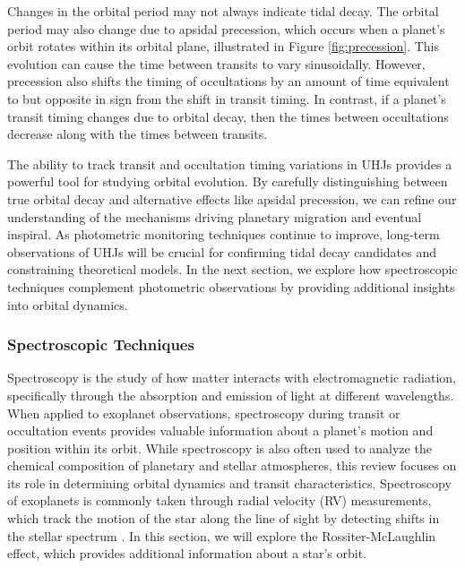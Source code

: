 \documentclass[oneside,12pt]{amsart}
\numberwithin{page}{section}
\begin{document}
Changes in the orbital period may not always indicate tidal decay. The orbital period may also change due to apsidal precession, which occurs when a planet's orbit rotates within its orbital plane, illustrated in Figure \ref{fig:precession}. This evolution can cause the time between transits to vary sinusoidally. However, precession also shifts the timing of occultations by an amount of time equivalent to but opposite in sign from the shift in transit timing. In contrast, if a planet's transit timing changes due to orbital decay, then the times between occultations decrease along with the times between transits.

The ability to track transit and occultation timing variations in UHJs provides a powerful tool for studying orbital evolution. By carefully distinguishing between true orbital decay and alternative effects like apsidal precession, we can refine our understanding of the mechanisms driving planetary migration and eventual inspiral. As photometric monitoring techniques continue to improve, long-term observations of UHJs will be crucial for confirming tidal decay candidates and constraining theoretical models. In the next section, we explore how spectroscopic techniques complement photometric observations by providing additional insights into orbital dynamics.

\subsubsection{Spectroscopic Techniques}\label{sec:obs-spec}

Spectroscopy is the study of how matter interacts with electromagnetic radiation, specifically through the absorption and emission of light at different wavelengths. When applied to exoplanet observations, spectroscopy during transit or occultation events provides valuable information about a planet’s motion and position within its orbit. While spectroscopy is also often used to analyze the chemical composition of planetary and stellar atmospheres, this review focuses on its role in determining orbital dynamics and transit characteristics. Spectroscopy of exoplanets is commonly taken through radial velocity (RV) measurements, which track the motion of the star along the line of sight by detecting shifts in the stellar spectrum \citep{lovis2010radial}. In this section, we will explore the Rossiter-McLaughlin effect, which provides additional information about a star's orbit.
\end{document}
